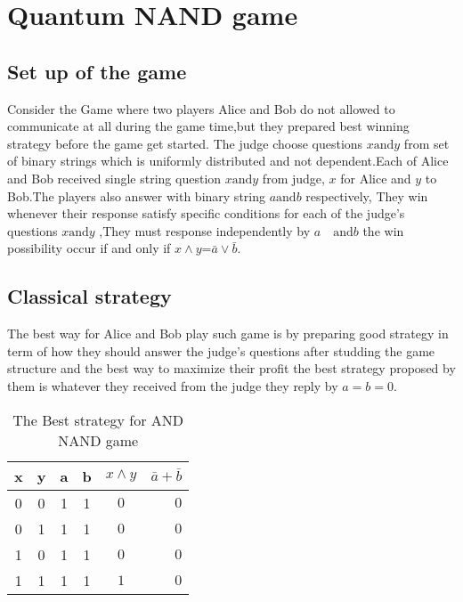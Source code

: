 \section{Quantum NAND game}
\subsection{Set up of the game} \hfill \break
Consider the Game where two players Alice and Bob  do not allowed to  communicate
at all during the game time,but they prepared  best winning strategy  before the game get started\citep*{ANDJIGA1988189}. The judge choose  questions $x  \text{and} y$  from set of binary strings which is uniformly  distributed and not dependent.Each of Alice and Bob received single string question $x \text{and} y$ from  judge, $x$ for Alice and $y$ to Bob.The players also answer with binary string  $a \text{and}  b$ respectively, They win whenever their response satisfy specific conditions for each of the judge's questions $x \text{and}  y$ ,They must response independently by  $a \quad \text{and}  b$ the win possibility occur  if and only if $x \wedge y$=$\bar{a}\vee\bar{b}$.
\subsection{Classical strategy}\hfill \break
The best way for Alice and Bob play such game is by preparing good strategy in term of how they should answer the judge's questions after studding the game structure and the best way to maximize their profit the best  strategy proposed by them is whatever they received  from the  judge they reply by $a=b=0$.

\begin {table}[htp]
\begin{center}
\begin{tabular}{ |c|c|c|c|c r| }
  \hline
  x & y & a & b &  $x \wedge y $ & $\bar{a}+\bar{b}$\\
  \hline 
  0 & 0 & 1 & 1 &$0$  & $0$\\
  \hline
  0 &1 & 1 & 1 &$0$  & $0$\\
  \hline
   1 & 0 & 1 & 1 &$0$ &  $0$\\
  \hline
  1 & 1 & 1 & 1 &$1$  & $0$\\
  \hline
\end{tabular}
\caption {The Best strategy for AND NAND game}
\end{center}
\end{table}

